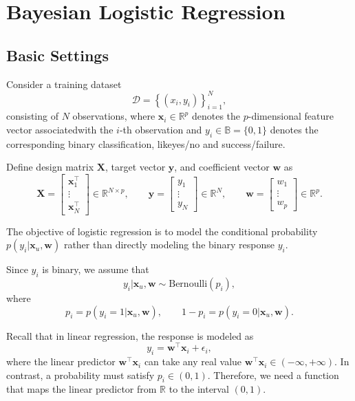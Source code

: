 \documentclass[../Bayesian_Inference.tex]{subfiles}
\begin{document}
\section{Bayesian Logistic Regression}

\subsection{Basic Settings}

Consider a training dataset 
\[
    \mathcal{D} = \left\{(x_i,y_i)\right\}_{i=1}^{N},
\]
consisting of $N$ observations, where $\bm{x}_i \in \mathbb{R}^{p}$ denotes the $p$-dimensional feature vector associated{w}ith the $i$-th observation and $y_i \in \mathbb{B} = \{0,1\}$ denotes the corresponding binary classification, like{y}es/no and success/failure. 

Define design matrix $\mathbf{X}$, target vector $\bm{y}$, and coefficient vector $\bm{w}$ as 
\[
    \mathbf{X} = \begin{bmatrix}
        \bm{x}_1^{\top} \\
        \vdots \\
        \bm{x}_N^{\top}
    \end{bmatrix} \in \mathbb{R}^{N \times p}, \qquad
    \bm{y} = \begin{bmatrix}
        {y}_1 \\
        \vdots \\
        {y}_N
    \end{bmatrix} \in \mathbb{R}^{N}, \qquad
    \bm{w} = \begin{bmatrix}
        {w}_1 \\
        \vdots \\
        {w}_p
    \end{bmatrix} \in \mathbb{R}^{p}.
\]

The objective of logistic regression is to model the conditional probability $p(y_i | \bm{x}_u, \bm{w})$ rather than directly modeling the binary response $y_i$. 

Since $y_i$ is binary, we assume that
\[
   {y}_i | \bm{x}_u, \bm{w} \sim \mathrm{Bernoulli}(p_i),
\]
where 
\[
    p_i = p(y_i = 1 | \bm{x}_u, \bm{w}), \qquad 1- p_i = p(y_i = 0 | \bm{x}_u, \bm{w}).
\]

Recall that in linear regression, the response is modeled as
\[
   {y}_i = \bm{w}^{\top} \bm{x}_i + \epsilon_i,
\]
where the linear predictor $\bm{w}^{\top}\bm{x}_i$ can take any real value $\bm{w}^{\top} \bm{x}_i \in (- \bm{\infty}, + \bm{\infty})$. In contrast, a probability must satisfy $p_i \in (0,1)$. Therefore, we need a function that maps the linear predictor from $\mathbb{R}$ to the interval $(0,1)$. 
\end{document}
